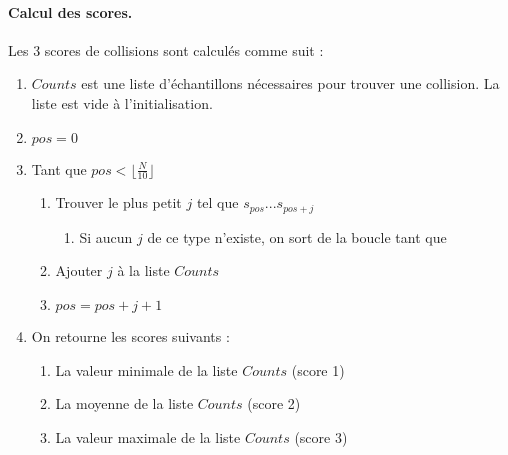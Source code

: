 \paragraph{Calcul des scores.\\}
Les 3 scores de collisions sont calculés comme suit : 
\begin{enumerate}
\item $Counts$  est une liste d'échantillons nécessaires pour trouver une collision. La liste est vide à l'initialisation.
\item $pos=0$
\item Tant que $pos < \lfloor\frac{N}{10}\rfloor$
	\begin{enumerate}
	\item Trouver le plus petit $j$ tel que $s_{pos} ... s_{pos+j}$
		\begin{enumerate}
		\item Si aucun $j$ de ce type n'existe, on sort de la boucle tant que
		\end{enumerate}
	\item Ajouter $j$ à la liste $Counts$
	\item $pos = pos + j + 1$
	\end{enumerate}
\item On retourne les scores suivants : 
	\begin{enumerate}
	\item La valeur minimale de la liste $Counts$ (score 1)
	\item La moyenne de la liste $Counts$ (score 2)
	\item La valeur maximale de la liste $Counts$ (score 3)
	\end{enumerate}
\end{enumerate}

